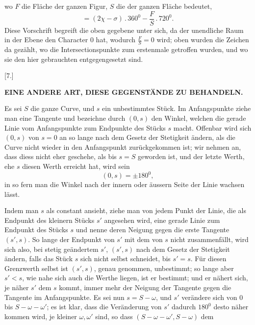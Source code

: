 %
\noindent wo $F$ die Fläche der ganzen Figur, $S$ die der ganzen Fläche bedeutet,
\[
= (2\chi - \sigma) \, . \, 360^0 - \frac{F}{S} \,.\,720^0.
\]
Diese Vorschrift begreift die oben gegebene unter sich, da der unendliche Raum in der Ebene den Character 0 hat, wodurch $\frac{F}{S} = 0$ wird; oben wurden die Zeichen da gezählt, wo die Intersectionspunkte zum erstenmale getroffen wurden, und wo sie den hier gebrauchten entgegengesetzt sind.

\begin{center}
[7.]
\end{center}

\begin{center}\textbf{EINE ANDERE ART, DIESE GEGENSTÄNDE ZU BEHANDELN.}\end{center}

Es sei $S$ die ganze Curve, und $s$ ein unbestimmtes Stück. Im Anfangspunkte ziehe man eine Tangente und bezeichne durch $(0, s)$ den Winkel, welchen die gerade Linie vom Anfangspunkte zum Endpunkte des Stücks $s$ macht. Offenbar wird sich $(0, s)$ von $s = 0$ an so lange nach dem Gesetz der Stetigkeit ändern, als die Curve nicht wieder in den Anfangspunkt zurückgekommen ist; wir nehmen an, dass diess nicht eher geschehe, als bis $s = S$ geworden ist, und der letzte Werth, ehe $s$ diesen Werth erreicht hat, wird sein
\[
(0, s) = \pm 180^0,
\]
in so fern man die Winkel nach der innern oder äussern Seite der Linie wachsen lässt.

Indem man $s$ als constant ansieht, ziehe man von jedem Punkt der Linie, die als Endpunkt des kleinern Stücks $s'$ angesehen wird, eine gerade Linie zum Endpunkt des Stücks $s$ und nenne deren Neigung gegen die erste Tangente $(s', s)$. So lange der Endpunkt von $s'$ mit dem von $s$ nicht zusammenfällt, wird sich also, bei stetig geändertem $s'$, $(s', s)$ nach dem Gesetz der Stetigkeit ändern, falls das Stück $s$ sich nicht selbst schneidet, bis $s' = s$. Für diesen Grenzwerth selbst ist $(s', s)$, genau genommen, unbestimmt; so lange aber $s' < s$, wie nahe sich auch die Werthe liegen, ist er bestimmt; und er nähert sich, je näher $s'$ dem $s$ kommt, immer mehr der Neigung der Tangente gegen die Tangente im Anfangspunkte. Es sei nun $s = S - \omega$, und $s'$ verändere sich von $0$ bis $S - \omega - \omega'$; es ist klar, dass die Veränderung von $s'$ dadurch $180^0$ desto näher kommen wird, je kleiner $\omega, \omega'$ sind, so dass $(S - \omega - \omega', S - \omega)$ dem
